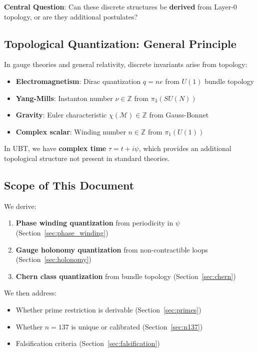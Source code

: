 \documentclass[12pt]{article}
\newcommand{\Z}{\mathbb{Z}}
\newcommand{\M}{\mathcal{M}}
\begin{document}
\textbf{Central Question}: Can these discrete structures be \textbf{derived} from Layer-0 topology, or are they additional postulates?

\subsection{Topological Quantization: General Principle}

In gauge theories and general relativity, discrete invariants arise from topology:
\begin{itemize}
    \item \textbf{Electromagnetism}: Dirac quantization $q = ne$ from $U(1)$ bundle topology
    \item \textbf{Yang-Mills}: Instanton number $\nu \in \Z$ from $\pi_3(SU(N))$
    \item \textbf{Gravity}: Euler characteristic $\chi(\M) \in \Z$ from Gauss-Bonnet
    \item \textbf{Complex scalar}: Winding number $n \in \Z$ from $\pi_1(U(1))$
\end{itemize}

In UBT, we have \textbf{complex time} $\tau = t + i\psi$, which provides an additional topological structure not present in standard theories.

\subsection{Scope of This Document}

We derive:
\begin{enumerate}
    \item \textbf{Phase winding quantization} from periodicity in $\psi$ (Section~\ref{sec:phase_winding})
    \item \textbf{Gauge holonomy quantization} from non-contractible loops (Section~\ref{sec:holonomy})
    \item \textbf{Chern class quantization} from bundle topology (Section~\ref{sec:chern})
\end{enumerate}

We then address:
\begin{itemize}
    \item Whether prime restriction is derivable (Section~\ref{sec:primes})
    \item Whether $n=137$ is unique or calibrated (Section~\ref{sec:n137})
    \item Falsification criteria (Section~\ref{sec:falsification})
\end{itemize}
\end{document}
